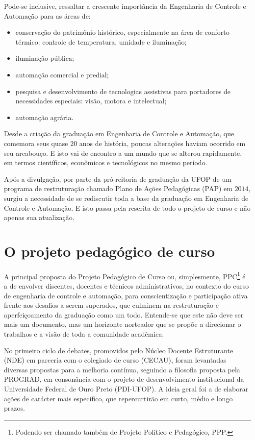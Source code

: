 Pode-se inclusive, ressaltar a crescente importância da Engenharia de Controle e Automação para as áreas de:
\begin{itemize}
\item conservação do patrimônio histórico, especialmente na área de conforto térmico: controle de temperatura, umidade e iluminação;
\item iluminação pública;
\item automação comercial e predial;
\item pesquisa e desenvolvimento de tecnologias assistivas para portadores de necessidades especiais: visão, motora e intelectual;
\item automação agrária.
\end{itemize}

Desde a criação da graduação em Engenharia de Controle e Automação, que comemora seus quase $20$ anos de história, poucas alterações haviam ocorrido em seu arcabouço. E isto vai de encontro a um mundo que se alterou rapidamente, em termos científicos, econômicos e tecnológicos no mesmo período.

Após a divulgação, por parte da pró-reitoria de graduação da UFOP de um programa de restruturação chamado Plano de Ações Pedagógicas (PAP) em $2014$, surgiu a necessidade de se rediscutir toda a base da graduação em Engenharia de Controle e Automação. E isto passa pela rescrita de todo o projeto de curso e não apenas sua atualização.

\section[O PPC]{O projeto pedag{\'o}gico de curso} \label{sec:ocurso}
%
A principal proposta do Projeto Pedagógico de Curso ou, simplesmente, PPC\footnote{Podendo ser chamado também de Projeto Político e Pedagógico, PPP.} {\'e} a de envolver discentes, docentes e t{\'e}cnicos administrativos, no contexto do curso de engenharia de controle e automa{\c c}{\~a}o, para conscientiza{\c c}{\~a}o  e participa{\c c}{\~a}o ativa frente aos desafios a serem superados, que culminem na restrutura{\c c}{\~a}o e aperfei{\c c}oamento da graduação como um todo. Entende-se que este n{\~a}o deve ser mais um documento, mas um horizonte norteador que se prop{\~o}e a direcionar o trabalhos e a vis{\~a}o de toda a comunidade acad{\^e}mica. 

No primeiro ciclo de debates, promovidos pelo N{\'u}cleo Docente Estruturante (NDE) em parceria com o colegiado de curso (CECAU), foram levantadas diversas propostas para a melhoria cont{\'i}nua, seguindo a filosofia proposta pela PROGRAD, em conson{\^a}ncia com o projeto de desenvolvimento institucional da Universidade Federal de Ouro Preto (PDI-UFOP). A ideia geral foi a de elaborar a{\c c}{\~o}es de car{\'a}cter mais espec{\'i}fico, que repercurtir{\~a}o em curto, m{\'e}dio e longo prazos.

